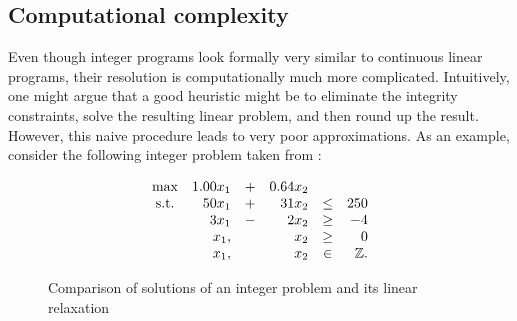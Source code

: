 \subsection{Computational complexity} %

Even though integer programs look formally very similar to continuous linear
programs, their resolution is computationally much more complicated.
Intuitively, one might argue that a good heuristic might be to eliminate the
integrity constraints, solve the resulting linear problem, and then round up
the result. However, this naive procedure leads to very poor approximations. As
an example, consider the following integer problem taken from \cite{wo:integer}:

\begin{equation*}
    \begin{array}{crcrcr}
        \max & 1.00 x_1 &+& 0.64 x_2           \\
        \text{s.t.}
             &   50 x_1 &+&   31 x_2 &\leq& 250\\
             &    3 x_1 &-&    2 x_2 &\geq&  -4\\
             &      x_1,& &      x_2 &\geq&   0\\
             &      x_1,& &      x_2 &\in &  {\mathbb{Z}}.
    \end{array}
\end{equation*}

\begin{figure}
    \centering
    
    
    \caption{
        Comparison of solutions of an integer problem and its linear relaxation
    }
    \label{fig:rounding}
\end{figure}

